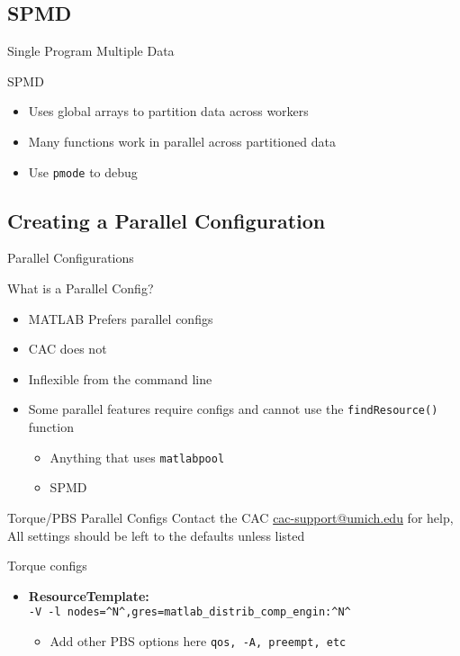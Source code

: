 \documentclass[handout]{beamer}
\begin{document}
   \subsection{SPMD}
\begin{frame}{Single Program Multiple Data}
 \begin{block}{SPMD}
  \begin{itemize}
    \item Uses global arrays to partition data across workers
    \item Many functions work in parallel across partitioned data
    \item Use \texttt{pmode} to debug
  \end{itemize}
 \end{block}
\end{frame}

   \subsection{Creating a Parallel Configuration}
\begin{frame}{Parallel Configurations}
\begin{block}{What is a Parallel Config?}
 \begin{itemize}
  \item MATLAB Prefers parallel configs
  \item CAC does not
  \item Inflexible from the command line
  \item Some parallel features require configs and cannot use the \texttt{findResource()} function
  \begin{itemize}
   \item Anything that uses \texttt{matlabpool}
   \item SPMD
  \end{itemize}
 \end{itemize}
\end{block}
\end{frame}

\begin{frame}{Torque/PBS Parallel Configs}
 Contact the CAC \url{cac-support@umich.edu} for help, All settings should be left to the defaults unless listed
 \begin{block}{Torque configs}
  \begin{itemize}
   \item {\bf ResourceTemplate:}\\ \texttt{-V -l nodes=\^{}N\^{},gres=matlab\_distrib\_comp\_engin:\^{}N\^{}}
    \begin{itemize}
     \item {Add other PBS options here \texttt{qos, -A, preempt, etc}}
    \end{itemize}
  \end{itemize}
 \end{block}
\end{frame}
\end{document}
